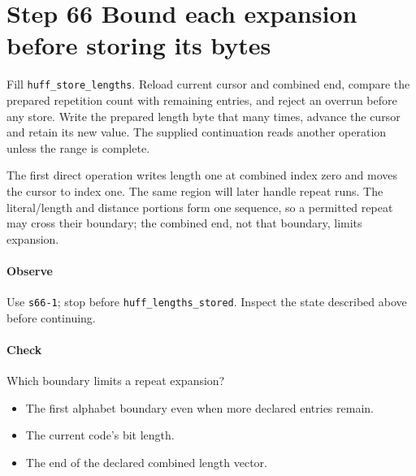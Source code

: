 \section{Step 66 Bound each expansion before storing its bytes}\label{png-huff-s66}
Fill \texttt{huff\_store\_lengths}. Reload current cursor and combined end, compare the prepared repetition count with remaining entries, and reject an overrun before any store. Write the prepared length byte that many times, advance the cursor and retain its new value. The supplied continuation reads another operation unless the range is complete.

The first direct operation writes length one at combined index zero and moves the cursor to index one. The same region will later handle repeat runs. The literal/length and distance portions form one sequence, so a permitted repeat may cross their boundary; the combined end, not that boundary, limits expansion.

\paragraph{Observe} Use \texttt{s66-1}; stop before \texttt{huff\_lengths\_stored}. Inspect the state described above before continuing.

\paragraph{Check} Which boundary limits a repeat expansion?
\begin{itemize}
  \item[A.] The first alphabet boundary even when more declared entries remain.
  \item[B.] The current code’s bit length.
  \item[C.] The end of the declared combined length vector.
\end{itemize}

